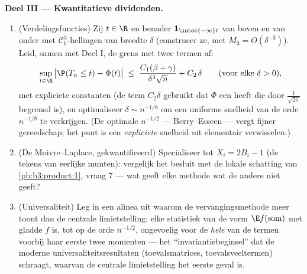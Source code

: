 \begin{problem}
\medskip
\noindent\textbf{Deel III --- Kwantitatieve dividenden.}
\begin{enumerate}[resume]
  \item (Verdelingsfuncties) Zij $t \in \R$ en benader $\mathbf
        1_{\intoc{-\infty}t}$ van boven en van onder met $\mathcal
        C^3_b$-hellingen van breedte $\delta$ (construeer ze, met
        $M_3 = O(\delta^{-3})$). Leid, samen met Deel I, de grens
        met twee termen af:
        \[
        \sup_{t\in\R}\,\bigl|\P(T_n \leq t) -
        \Phi(t)\bigr| \;\leq\;
        \frac{C_1(\beta + \gamma)}{\delta^3\sqrt n} +
        C_2\,\delta
        \qquad (\text{voor elke } \delta > 0),
        \]
        met expliciete constanten (de term $C_2\delta$ gebruikt
        dat $\Phi$ een  heeft die door
        $\frac1{\sqrt{2\pi}}$ begrensd is), en optimaliseer
        $\delta \sim n^{-1/8}$ om een uniforme snelheid van de
        orde $n^{-1/8}$ te verkrijgen. (De optimale $n^{-1/2}$
        --- Berry--Esseen --- vergt fijner gereedschap; het punt
        is een \emph{expliciete} snelheid uit elementair
        verwisselen.)
  \item (De Moivre--Laplace, gekwantificeerd) Specialiseer tot
        $X_i = 2B_i - 1$ (de tekens van eerlijke munten):
        vergelijk het besluit met de lokale schatting van
        \cref{pb:b3:product:1}, vraag 7 --- wat geeft elke
        methode wat de andere niet geeft?
  \item (Universaliteit) Leg in een alinea uit waarom de
        vervangingsmethode meer toont dan de centrale
        limietstelling: elke statistiek van de vorm $\E
        f(\text{som})$ met gladde $f$ is, tot op de orde
        $n^{-1/2}$, ongevoelig voor de \emph{hele}  van
        de termen voorbij haar eerste twee momenten --- het
        ``invariantiebeginsel'' dat de moderne
        universaliteitsresultaten (toevalsmatrices,
        toevalsveeltermen) schraagt, waarvan de centrale
        limietstelling het eerste geval is.
\end{enumerate}


\end{problem}
